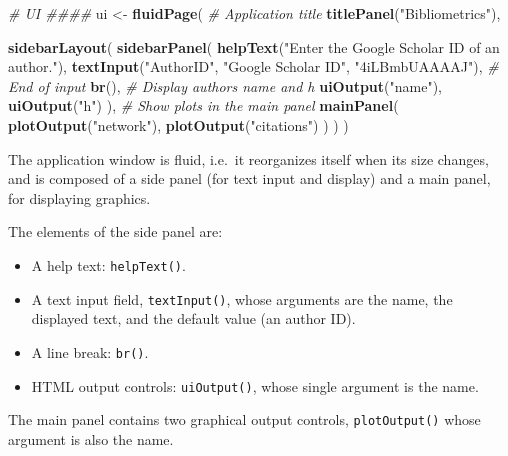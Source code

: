\documentclass[
  12pt,
  american,
  a4paper,
  extrafontsizes,onecolumn,openright
  ]{memoir}
\newenvironment{Shaded}{\begin{snugshade}}{\end{snugshade}}
\newcommand{\CommentTok}[1]{\textcolor[rgb]{0.56,0.35,0.01}{\textit{#1}}}
\newcommand{\FunctionTok}[1]{\textcolor[rgb]{0.13,0.29,0.53}{\textbf{#1}}}
\newcommand{\NormalTok}[1]{#1}
\newcommand{\OtherTok}[1]{\textcolor[rgb]{0.56,0.35,0.01}{#1}}
\newcommand{\StringTok}[1]{\textcolor[rgb]{0.31,0.60,0.02}{#1}}
\providecommand{\tightlist}{%
  \setlength{\itemsep}{0pt}\setlength{\parskip}{0pt}}
\begin{document}
\begin{Shaded}
\begin{Highlighting}[]
\CommentTok{\# UI \#\#\#\#}
\NormalTok{ui }\OtherTok{\textless{}{-}} \FunctionTok{fluidPage}\NormalTok{(}
  \CommentTok{\# Application title}
  \FunctionTok{titlePanel}\NormalTok{(}\StringTok{"Bibliometrics"}\NormalTok{),}
  
  \FunctionTok{sidebarLayout}\NormalTok{(}
    \FunctionTok{sidebarPanel}\NormalTok{(}
      \FunctionTok{helpText}\NormalTok{(}\StringTok{"Enter the Google Scholar ID of an author."}\NormalTok{),}
      \FunctionTok{textInput}\NormalTok{(}\StringTok{"AuthorID"}\NormalTok{, }\StringTok{"Google Scholar ID"}\NormalTok{, }\StringTok{"4iLBmbUAAAAJ"}\NormalTok{),}
      \CommentTok{\# End of input}
      \FunctionTok{br}\NormalTok{(),}
      \CommentTok{\# Display author\textquotesingle{}s name and h}
      \FunctionTok{uiOutput}\NormalTok{(}\StringTok{"name"}\NormalTok{),}
      \FunctionTok{uiOutput}\NormalTok{(}\StringTok{"h"}\NormalTok{)}
\NormalTok{    ),}
    \CommentTok{\# Show plots in the main panel}
    \FunctionTok{mainPanel}\NormalTok{(}
      \FunctionTok{plotOutput}\NormalTok{(}\StringTok{"network"}\NormalTok{),}
      \FunctionTok{plotOutput}\NormalTok{(}\StringTok{"citations"}\NormalTok{)}
\NormalTok{    )}
\NormalTok{  )}
\NormalTok{)}
\end{Highlighting}
\end{Shaded}

\normalsize

The application window is fluid, i.e.~it reorganizes itself when its size changes, and is composed of a side panel (for text input and display) and a main panel, for displaying graphics.

The elements of the side panel are:

\begin{itemize}
\tightlist
\item
  A help text: \texttt{helpText()}.
\item
  A text input field, \texttt{textInput()}, whose arguments are the name, the displayed text, and the default value (an author ID).
\item
  A line break: \texttt{br()}.
\item
  HTML output controls: \texttt{uiOutput()}, whose single argument is the name.
\end{itemize}

The main panel contains two graphical output controls, \texttt{plotOutput()} whose argument is also the name.
\end{document}

